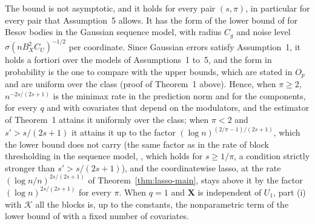 \documentclass[10pt]{book}
\theoremstyle{definition}
\newcommand{\bX}{\mathbf{X}}
\newcommand{\seff}{s'}
\newcommand{\Kcal}{\mathcal{K}}
\begin{document}
{The bound is not asymptotic, and it holds for every pair $(s,\pi)$, in
particular for every pair that Assumption~5 allows. It has the form of the
lower bound of \citet[Theorem~5]{Donoho-Johnstone-1998} for Besov bodies in
the Gaussian sequence model, with radius $C_g$ and noise level
$\sigma(nB_X^{2}C_U)^{-1/2}$ per coordinate. Since Gaussian errors satisfy
Assumption~1, it holds a fortiori over the models of Assumptions~1 to~5, and
the form in probability is the one to compare with the upper bounds, which are
stated in $O_p$ and are uniform over the class (proof of Theorem~1 above).
Hence, when $\pi \ge 2$, $n^{-2s/(2s+1)}$ is the minimax rate in the
prediction norm and for the components, for every $q$ and with covariates
that depend on the modulators, and the estimator of Theorem~1 attains it
uniformly over the class; when $\pi < 2$ and $\seff > s/(2s+1)$ it attains it
up to the factor $(\log n)^{(2/\pi-1)/(2s+1)}$, which the lower bound does not
carry
(the same factor as in the rate of block thresholding in the sequence model,
\citealp[Theorem~4]{Cai-1999}, which holds for $s \ge 1/\pi$, a condition
strictly stronger than $\seff > s/(2s+1)$), and the coordinatewise lasso, at the rate $(\log n/n)^{2s/(2s+1)}$ of
Theorem~\ref{thm:lasso-main}, stays above it by the factor
$(\log n)^{2s/(2s+1)}$ for every $\pi$. When $q = 1$ and $\bX$ is independent
of $U_1$, part (i) with $\Kcal$ all the blocks is, up to the constants, the
nonparametric term of the lower bound of
\citet[Theorem~1, eqs.~3.6 and~3.7]{Klopp-Pensky-2015} with a fixed number of
covariates.

}
\end{document}
